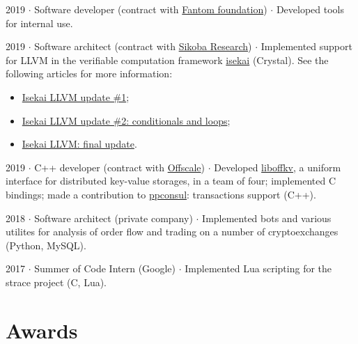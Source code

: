 \documentclass[10pt]{article}
\begin{document}
\medskip

2019 $\cdot$ Software developer (contract with \href{https://fantom.foundation}{Fantom foundation}) $\cdot$ Developed tools for internal use.

\medskip

2019 $\cdot$ Software architect (contract with \href{https://research.sikoba.com}{Sikoba Research}) $\cdot$ Implemented support for LLVM in the verifiable computation framework \href{https://github.com/sikoba/isekai}{isekai} (Crystal). See the following articles for more information:
\begin{itemize}
    \item \href{https://medium.com/sikoba-network/isekai-technical-update-llvm-d5003fc8f009}{Isekai LLVM update \#1};
    \item \href{https://medium.com/sikoba-network/isekai-llvm-update-2-conditionals-and-loops-81296a0eccbf}{Isekai LLVM update \#2: conditionals and loops};
    \item \href{https://medium.com/sikoba-network/isekai-llvm-final-update-894fb6863fcf}{Isekai LLVM: final update}.
\end{itemize}

\medskip

2019 $\cdot$ C++ developer (contract with \href{https://offscale.io}{Offscale}) $\cdot$ Developed \href{https://github.com/offscale/liboffkv}{liboffkv}, a uniform interface for distributed key-value storages, in a team of four; implemented C bindings; made a contribution to \href{https://github.com/oliora/ppconsul}{ppconsul}: transactions support (C++).

\medskip

2018 $\cdot$ Software architect (private company) $\cdot$ Implemented bots and various utilites for analysis of order flow and trading on a number of cryptoexchanges (Python, MySQL).

\medskip

2017 $\cdot$ Summer of Code Intern (Google) $\cdot$ Implemented Lua scripting for the strace project (C, Lua).

\medskip

\section{Awards}
\end{document}

